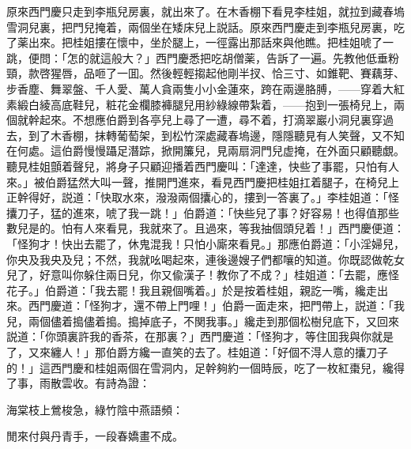 原來西門慶只走到李瓶兒房裏，就出來了。在木香棚下看見李桂姐，就拉到藏春塢雪洞兒裏，把門兒掩着，兩個坐在矮床兒上説話。原來西門慶走到李瓶兒房裏，吃了薬出來。把桂姐摟在懷中，坐於腿上，一徑露出那話來與他瞧。把桂姐唬了一跳，便問：「怎的就這般大？」西門慶悉把吃胡僧薬，告訴了一遍。先教他低垂粉頸，款啓猩唇，品咂了一囬。然後輕輕搊起他剛半扠、恰三寸、如錐靶、賽藕芽、步香塵、舞翠盤、千人愛、萬人貪兩隻小小金蓮來，跨在兩邊胳膊，——穿着大紅素緞白綾高底鞋兒，粧花金欄膝褲腿兒用紗綠線帶紮着，——抱到一張椅兒上，兩個就幹起來。不想應伯爵到各亭兒上尋了一遭，尋不着，打滴翠巖小洞兒裏穿過去，到了木香棚，抹轉葡萄架，到松竹深處藏春塢邊，隱隱聽見有人笑聲，又不知在何處。這伯爵慢慢躡足潛踪，掀開簾兒，見兩扇洞門兒虚掩，在外面只顧聽覷。聽見桂姐顫着聲兒，將身子只顧迎播着西門慶叫：「達達，快些了事罷，只怕有人來。」被伯爵猛然大叫一聲，推開門進來，看見西門慶把桂姐扛着腿子，在椅兒上正幹得好，説道：「快取水來，潑潑兩個攮心的，摟到一答裏了。」李桂姐道：「怪攮刀子，猛的進來，唬了我一跳！」伯爵道：「快些兒了事？好容易！也得值那些數兒是的。怕有人來看見，我就來了。且過來，等我抽個頭兒着！」西門慶便道：「怪狗才！快出去罷了，休鬼混我！只怕小廝來看見。」那應伯爵道：「小淫婦兒，你央及我央及兒；不然，我就吆喝起來，連後邊嫂子們都嚷的知道。你既認做乾女兒了，好意叫你躲住兩日兒，你又偸漢子！教你了不成？」桂姐道：「去罷，應怪花子。」伯爵道：「我去罷！我且親個嘴着。」於是按着桂姐，親訖一嘴，纔走出來。西門慶道：「怪狗才，還不帶上門哩！」伯爵一面走來，把門帶上，説道：「我兒，兩個儘着搗儘着搗。搗掉底子，不関我事。」纔走到那個松樹兒底下，又回來説道：「你頭裏許我的香茶，在那裏？」西門慶道：「怪狗才，等住囬我與你就是了，又來纏人！」那伯爵方纔一直笑的去了。桂姐道：「好個不淂人意的攮刀子的！」這西門慶和桂姐兩個在雪洞内，足幹夠約一個時辰，吃了一枚紅棗兒，纔得了事，雨散雲收。有詩為證：

\begin{myquote}
海棠枝上鶯梭急，綠竹陰中燕語頻：　

閒來付與丹青手，一段春嬌畫不成。
\end{myquote}

